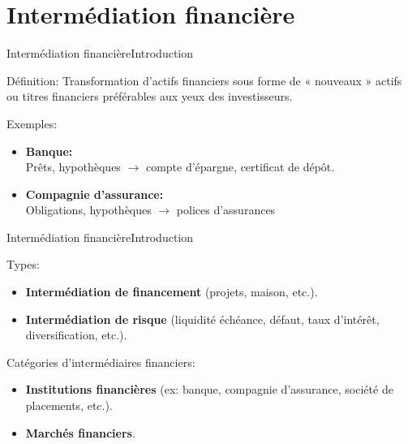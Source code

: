 \documentclass{beamer}
\begin{document}
\section{Intermédiation financière}
\begin{frame}{Intermédiation financière}{Introduction}
\begin{block}{Définition:}
Transformation d’actifs financiers sous forme de « nouveaux » actifs ou titres financiers préférables aux yeux des investisseurs.
\end{block}
\begin{block}{Exemples:}
\begin{itemize}
\item \textbf{Banque:} \\ Prêts, hypothèques $\rightarrow$ compte
d’épargne, certificat de dépôt.
\item \textbf{Compagnie d’assurance:} \\ Obligations, hypothèques $\rightarrow$ polices d’assurances
\end{itemize}
\end{block}

\end{frame}

\begin{frame}{Intermédiation financière}{Introduction}
\begin{block}{Types:}
\begin{itemize}
\item \textbf{Intermédiation de financement} (projets, maison, etc.).
\item \textbf{Intermédiation de risque} (liquidité échéance, défaut, taux d’intérêt, diversification, etc.).
\end{itemize}
\end{block}
\begin{block}{Catégories d’intermédiaires financiers:}
\begin{itemize}
\item \textbf{Institutions financières} (ex: banque, compagnie
d’assurance, société de placements, etc.).
\item \textbf{Marchés financiers}.
\end{itemize}
\end{block}

\end{frame}
\end{document}
